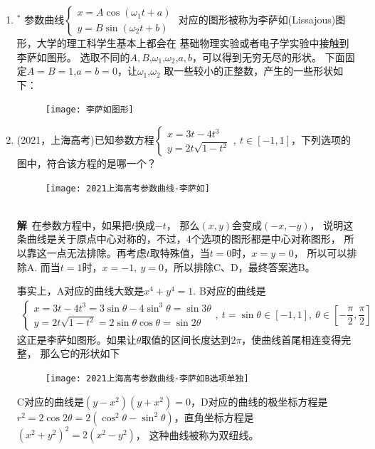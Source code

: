 \begin{enumerate}[label={【\textbf{例\thechapter.\arabic*}】},
 leftmargin=\inteval{\myenumleftmargin}pt,
 itemsep=\inteval{\myenumitempsep}pt,
 itemindent=\inteval{\myenumitemindent}pt]
\item $^*$ 参数曲线$ \begin{cases}
    x=A\cos(\omega_1 t+a) \\
    y=B\sin(\omega_2 t+b)
\end{cases} $ 对应的图形被称为李萨如(Lissajous)图形，大学的理工科学生基本上都会在
基础物理实验或者电子学实验中接触到李萨如图形。
选取不同的$ A,B $,$ \omega_1 $,$ \omega_2 $,$ a,b $，可以得到无穷无尽的形状。
下面固定$ A=B=1 $,$ a=b=0 $，让$ \omega_1 $,$ \omega_2 $
取一些较小的正整数，产生的一些形状如下：
\begin{figure}[H]
    \centering
    \texttt{[image: 李萨如图形]}
\end{figure}

\item 
(2021，上海高考)已知参数方程$ \begin{cases}
    x=3t-4t^3 \\
    y=2t\sqrt{1-t^2}
\end{cases} ,\ t\in [-1,1] $，下列选项的图中，符合该方程的是哪一个？
\begin{figure}[!htbp]
    \centering
    \texttt{[image: 2021上海高考参数曲线-李萨如]}
\end{figure} \\
\textbf{解}\ 在参数方程中，如果把$ t $换成$ -t $，
那么$ (x,y) $会变成$ (-x,-y) $，
说明这条曲线是关于原点中心对称的，不过，4个选项的图形都是中心对称图形，
所以靠这一点无法排除。再考虑$ t $取特殊值，当$ t=0 $时，$ x=y=0 $，
所以可以排除A. 而当$ t=1 $时，$ x=-1,\ y=0 $，所以排除C、D，最终答案选B。

事实上，A对应的曲线大致是$ x^4+y^4=1 $. B对应的曲线是
\begin{align*}
    \begin{cases}
        x=3t-4t^3=3\sin\theta-4\sin^3\theta=\sin3\theta \\
        y=2t\sqrt{1-t^2}=2\sin\theta\cos\theta=\sin2\theta
    \end{cases},\ t=\sin\theta\in [-1,1],\ 
    \theta\in[-\dfrac{\pi}{2},\dfrac{\pi}{2}]
\end{align*}
这正是李萨如图形。如果让$ \theta $取值的区间长度达到$ 2\pi $，使曲线首尾相连变得完整，
那么它的形状如下
\begin{figure}[!htbp]
    \centering
    \texttt{[image: 2021上海高考参数曲线-李萨如B选项单独]}
\end{figure} 

C对应的曲线是$ (y-x^2)(y+x^2)=0 $，D对应的曲线的极坐标方程是$ r^2=2\cos2\theta=
2(\cos^2\theta-\sin^2\theta) $，直角坐标方程是$ (x^2+y^2)^2=2(x^2-y^2) $，
这种曲线被称为双纽线。


\end{enumerate}

